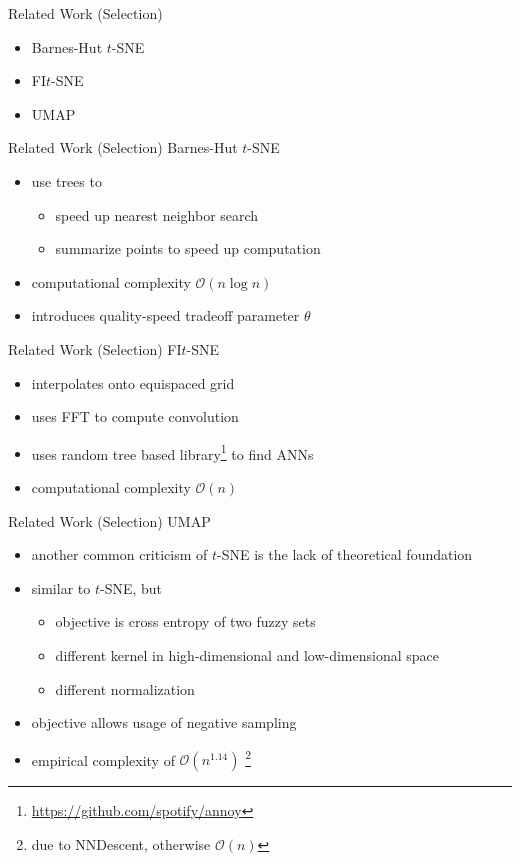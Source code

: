 \documentclass{beamer}
\begin{document}
\begin{frame}[fragile]{Related Work (Selection)}
    \begin{itemize}
        \item Barnes-Hut $t$-SNE
        \item FI$t$-SNE
        \item UMAP
    \end{itemize}
\end{frame}

\begin{frame}[fragile]{Related Work (Selection)}
    Barnes-Hut $t$-SNE
    \begin{itemize}
        \item use trees to
            \begin{itemize}
                \item speed up nearest neighbor search
                \item summarize points to speed up computation
            \end{itemize}
        \item computational complexity $\mathcal{O}(n \log n)$
        \item introduces quality-speed tradeoff parameter $\theta$
    \end{itemize}
\end{frame}

\begin{frame}[fragile]{Related Work (Selection)}
    FI$t$-SNE
    \begin{itemize}
        \item interpolates onto equispaced grid
        \item uses FFT to compute convolution
        \item uses random tree based library\footnote{\url{https://github.com/spotify/annoy}} to find ANNs
        \item computational complexity $\mathcal{O}(n)$
    \end{itemize}
\end{frame}

\begin{frame}[fragile]{Related Work (Selection)}
    UMAP
    \begin{itemize}
        \item another common criticism of $t$-SNE is the lack of theoretical foundation
        \item similar to $t$-SNE, but
            \begin{itemize}
                \item objective is cross entropy of two fuzzy sets
                \item different kernel in high-dimensional and low-dimensional space
                \item different normalization
            \end{itemize}
        \item objective allows usage of negative sampling
        \item empirical complexity of $\mathcal{O}(n^{1.14})$ \footnote{due to NNDescent, otherwise $\mathcal{O}(n)$}
    \end{itemize}
\end{frame}
\end{document}
